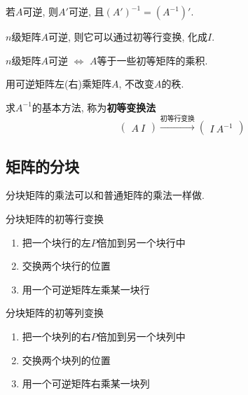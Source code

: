 \begin{Proposition}
若$A$可逆, 则$A'$可逆, 且$\left(A'\right)^{-1} = \left(A^{-1}\right)'$.
\end{Proposition}

\begin{Proposition}
$n$级矩阵$A$可逆, 则它可以通过初等行变换, 化成$I$.
\end{Proposition}

\begin{Proposition}
$n$级矩阵$A$可逆 $\iff$ $A$等于一些初等矩阵的乘积.
\end{Proposition}

\begin{Proposition}
用可逆矩阵左(右)乘矩阵$A$, 不改变$A$的秩.
\end{Proposition}

\begin{Note}
求$A^{-1}$的基本方法, 称为\textbf{初等变换法}
\[
\begin{pmatrix}
A~I
\end{pmatrix}
\xrightarrow{\text{初等行变换}}
\begin{pmatrix}
I~A^{-1}
\end{pmatrix}
\]
\end{Note}

\subsection{矩阵的分块}

\begin{Note}
分块矩阵的乘法可以和普通矩阵的乘法一样做.
\end{Note}

\begin{Note}
分块矩阵的初等行变换
\begin{enumerate}[(1)]
\item 把一个块行的左$P$倍加到另一个块行中
\item 交换两个块行的位置
\item 用一个可逆矩阵左乘某一块行
\end{enumerate}
\end{Note}

\begin{Note}
分块矩阵的初等列变换
\begin{enumerate}[(1)]
\item 把一个块列的右$P$倍加到另一个块列中
\item 交换两个块列的位置
\item 用一个可逆矩阵右乘某一块列
\end{enumerate}
\end{Note}

